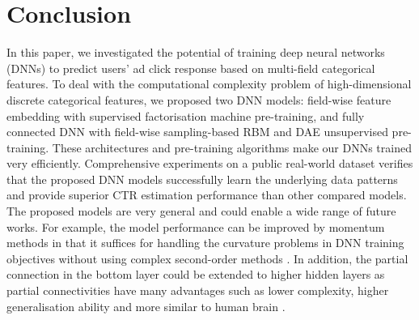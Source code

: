 \documentclass{llncs}
\begin{document}
\section{Conclusion}\label{sec:con}
In this paper, we investigated the potential of training deep neural networks (DNNs) to predict users' ad click response based on multi-field categorical features. To deal with the computational complexity problem of high-dimensional discrete categorical features, we proposed two DNN models: field-wise feature embedding with supervised factorisation machine pre-training, and fully connected DNN with field-wise sampling-based RBM and DAE unsupervised pre-training. These architectures and pre-training algorithms make our DNNs trained very efficiently. Comprehensive experiments on a public real-world dataset verifies that the proposed DNN models successfully learn the underlying data patterns and provide superior CTR estimation performance than other compared models.
The proposed models are very general and could enable a wide range of future works. For example, the model performance can be improved by momentum methods in that it suffices for handling the curvature problems in DNN training objectives without using complex second-order methods \cite{sutskever2013importance}. In addition, the partial connection in the bottom layer could be extended to higher hidden layers as partial connectivities have many advantages such as lower complexity, higher generalisation ability and more similar to human brain \cite{elizondo1997survey}.





\end{document}
